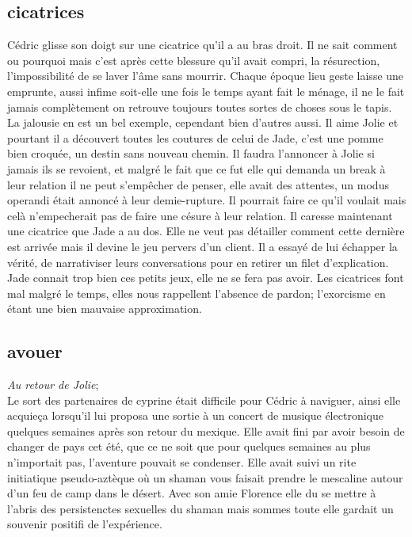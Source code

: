 \documentclass{article}
\begin{document}
\clearpage

\subsection{cicatrices}

Cédric glisse son doigt sur une cicatrice qu'il a au bras droit. Il ne sait
comment ou pourquoi mais c'est après cette blessure qu'il avait compri, la
résurection, l'impossibilité de se laver l'âme sans mourrir.  Chaque époque lieu
geste laisse une emprunte, aussi infime soit-elle une fois le temps ayant fait
le ménage, il ne le fait jamais complètement on retrouve toujours toutes sortes
de choses sous le tapis. La jalousie en est un bel exemple, cependant bien
d'autres aussi. Il aime Jolie et pourtant il a découvert toutes les coutures de
celui de Jade, c'est une pomme bien croquée, un destin sans nouveau chemin.  Il
faudra l'annoncer à Jolie si jamais ils se revoient, et malgré le fait que ce
fut elle qui demanda un break à leur relation il ne peut s'empêcher de penser,
elle avait des attentes, un modus operandi était annoncé à leur demie-rupture.
Il pourrait faire ce qu'il voulait mais celà n'empecherait pas de faire une
césure à leur relation. Il caresse maintenant une cicatrice que Jade a au dos.
Elle ne veut pas détailler comment cette dernière est arrivée mais il devine le
jeu pervers d'un client. Il a essayé de lui échapper la vérité, de narrativiser
leurs conversations pour en retirer un filet d'explication. Jade connait trop
bien ces petits jeux, elle ne se fera pas avoir. Les cicatrices font mal
malgré le temps, elles nous rappellent l'absence de pardon; l'exorcisme en étant
une bien mauvaise approximation.




\clearpage

\subsection{avouer}

\textit{Au retour de Jolie};\\

Le sort des partenaires de cyprine était difficile pour Cédric à naviguer, ainsi
elle acquieça lorsqu'il lui proposa une sortie à un concert de musique
électronique quelques semaines après son retour du mexique. Elle avait fini par
avoir besoin de changer de pays cet été, que ce ne soit que pour quelques
semaines au plus n'importait pas, l'aventure pouvait se condenser. Elle avait
suivi un rite initiatique pseudo-aztèque où un shaman vous faisait prendre le
mescaline autour d'un feu de camp dans le désert. Avec son amie Florence elle du
se mettre à l'abris des persistenctes sexuelles du shaman mais sommes toute elle
gardait un souvenir positifi de l'expérience.\\
\end{document}
